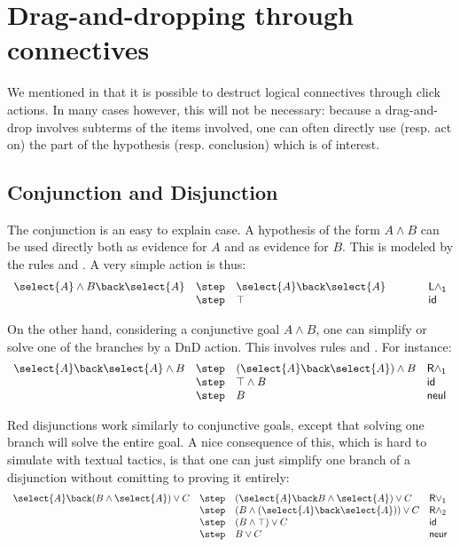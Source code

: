 \section{Drag-and-dropping through connectives}
We mentioned in  that it is possible to destruct logical
connectives through click actions. In many cases however, this will not be
necessary: because a drag-and-drop involves subterms of the items involved, one
can often directly use (resp. act on) the part of the hypothesis (resp.
conclusion) which is of interest.

\subsection{Conjunction and Disjunction}
The conjunction is an easy to explain case. A hypothesis of the form
$A\land B$ can be used directly both as evidence for $A$ and as evidence
for $B$. This is modeled by the rules  and
. A very simple action is thus:
$$
\begin{array}{llll}
  \select{A}\land B \back \select{A} & \step& \select{A} \back
  \select{A} \hbox to 1cm {\hfil}&\mathsf{L \land_1}\\
                                       & \step &\top & \mathsf{id}
\end{array}
$$

On the other hand, considering a conjunctive goal $A\land B$, one can
simplify or solve one of the branches by a DnD action. This involves
rules  and
. For instance:
$$
\begin{array}{llll}
  \select{A} \back \select{A}\land B &
                                         \step& (\select{A} \back
                                         \select{A})\land B &\mathsf{R \land_1}\\
                                       & \step& \top \land B  & \mathsf{id}\\
  &\step& B&\mathsf{neul}
\end{array}
$$

Red disjunctions work similarly to conjunctive goals, except that solving one
branch will solve the entire goal. A nice consequence of this, which is hard to
simulate with textual tactics, is that one can just simplify one branch of a
disjunction without comitting to proving it entirely:
$$
\begin{array}{llll}
  \select{A} \back (B \land \select{A}) \lor C
    & \step & (\select{A} \back B \land \select{A}) \lor C &\mathsf{R\lor_1}\\
    & \step & (B \land (\select{A} \back \select{A})) \lor C &\mathsf{R\land_2}\\
    & \step & (B \land \top) \lor C &\mathsf{id}\\
    & \step & B \lor C &\mathsf{neur}
\end{array}
$$

